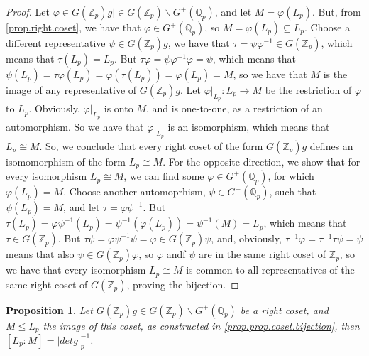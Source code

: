 \documentclass[12pt]{article}
\newtheorem{proposition}[theorem]{Proposition}
\begin{document}
\begin{proof}
Let $\varphi\in G(\mathbb{Z}_p)g|\in G(\mathbb{Z}_p)\backslash G^+(\mathbb{Q}_p)$, and let $M=\varphi(L_p)$. But, from \ref{prop.right.coset}, we have that $\varphi\in G^+(\mathbb{Q}_p)$, so $M=\varphi(L_p)\subseteq L_p$. Choose a different representative $\psi\in G(\mathbb{Z}_p)g$, we have that $\tau=\psi\varphi^{-1}\in G(\mathbb{Z}_p)$, which means that $\tau(L_p)=L_p$. But $\tau\varphi=\psi\varphi^{-1}\varphi=\psi$, which means that $\psi(L_p)=\tau\varphi(L_p)=\varphi(\tau(L_p))=\varphi(L_p)=M$, so we have that $M$ is the image of any representative of $G(\mathbb{Z}_p)g$. Let $\varphi|_{L_p}:L_p\rightarrow M$ be the restriction of $\varphi$ to $L_p$. Obviously, $\varphi|_{L_p}$ is onto $M$, and is one-to-one, as a restriction of an automorphism. So we have that $\varphi|_{L_p}$ is an isomorphism, which means that $L_p\cong M$. So, we conclude that every right coset of the form $G(\mathbb{Z}_p)g$ defines an isomomorphism of the form $L_p\cong M$. For the opposite direction, we show that for every isomorphism $L_p\cong M$, we can find some $\varphi\in G^{+}(\mathbb{Q}_p)$, for which $\varphi(L_p)=M$. Choose another automoprhism, $\psi\in G^{+}(\mathbb{Q}_p)$, such that $\psi(L_p)=M$, and let $\tau=\varphi\psi^{-1}$. But $\tau(L_p)=\varphi\psi^{-1}(L_p)=\psi^{-1}(\varphi(L_p))=\psi^{-1}(M)=L_p$, which means that $\tau\in G(\mathbb{Z}_p)$. But $\tau\psi=\varphi\psi^{-1}\psi=\varphi\in G(\mathbb{Z}_p)\psi$, and, obviously, $\tau^{-1}\varphi=\tau^{-1}\tau\psi=\psi$ means that also $\psi\in G(\mathbb{Z}_p)\varphi$, so $\varphi$ andf $\psi$ are in the same right coset of $\mathbb{Z}_p$, so we have that every isomorphism $L_p\cong M$ is common to all representatives of the same right coset of $G(\mathbb{Z}_p)$, proving the bijection.
\end{proof}
\begin{proposition}
\label{prop.index.submodule}
Let $G(\mathbb{Z}_p)g\in G(\mathbb{Z}_p)\backslash G^+(\mathbb{Q}_p)$ be a right coset, and $M\leq L_p$ the image of this coset, as constructed in \ref{prop.prop.coset.bijection}, then $[L_p:M]=|det g|_p^{-1}$.
\end{proposition}
\end{document}
